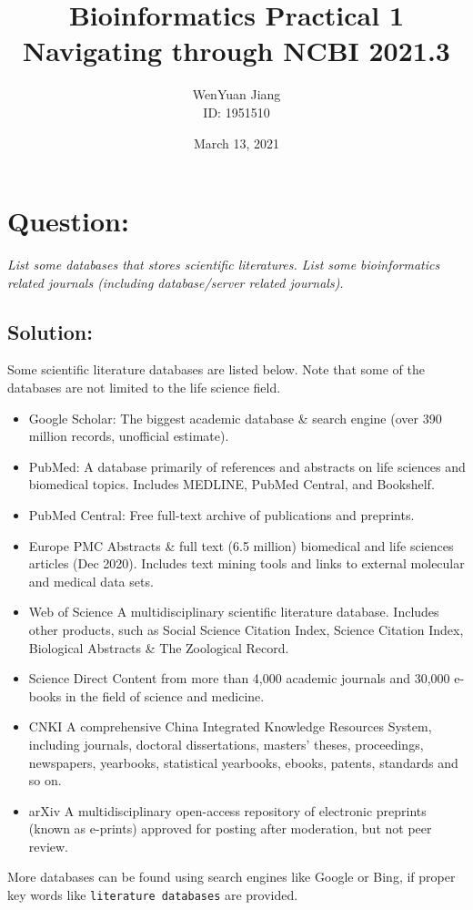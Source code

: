 \documentclass[en,black,12pt,normal]{elegantnote}
\title{Bioinformatics Practical 1\\\small{Navigating through NCBI 2021.3}}
\author{WenYuan Jiang\\ID: 1951510}
\institute{School of Life Science, Tongji University}
\date{March 13, 2021}
\newcommand{\upcite}[1]{\textsuperscript{\textsuperscript{\cite{#1}}}}
\begin{document}
\maketitle


\section{Question:}
\textit{List some databases that stores scientific literatures. List some bioinformatics related journals (including database/server related journals).}

\subsection*{Solution:}

Some scientific literature databases are listed below.\upcite{wiki:List_of_academic_databases_and_search_engines}
Note that some of the databases are not limited to the life science field.
\begin{itemize}
    \item Google Scholar\upcite{gusenbauer2019google}:
        \subitem The biggest academic database \& search engine (over 390 million records, unofficial estimate).
    \item PubMed\upcite{fiorini2017cutting}:
        \subitem A database primarily of references and abstracts on life sciences and biomedical topics. Includes MEDLINE, PubMed Central, and Bookshelf.
    \item PubMed Central\upcite{roberts2001pubmed}:
        \subitem Free full-text archive of publications and preprints.
    \item Europe PMC\upcite{europe2015europe}
        \subitem Abstracts \& full text (6.5 million) biomedical and life sciences articles (Dec 2020). Includes text mining tools and links to external molecular and medical data sets.
    \item Web of Science\upcite{mongeon2016journal}
        \subitem A multidisciplinary scientific literature database. Includes other products, such as Social Science Citation Index, Science Citation Index, Biological Abstracts \& The Zoological Record.
    \item Science Direct
        \subitem Content from more than 4,000 academic journals and 30,000 e-books in the field of science and medicine.
    \item CNKI\upcite{yu2005cnki}
        \subitem A comprehensive China Integrated Knowledge Resources System, including journals, doctoral dissertations, masters' theses, proceedings, newspapers, yearbooks, statistical yearbooks, ebooks, patents, standards and so on.
    \item arXiv\upcite{wiki:ArXiv}
        \subitem A multidisciplinary open-access repository of electronic preprints (known as e-prints) approved for posting after moderation, but not peer review.
\end{itemize}
More databases can be found using search engines like Google or Bing, if proper key words like \texttt{literature databases} are provided.
\end{document}
